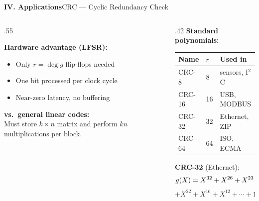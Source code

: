 \begin{frame}{\textbf{IV. Applications}}{CRC --- Cyclic Redundancy Check}

\begin{columns}[T]
  \begin{column}{.55\textwidth}

    \medskip
    \textbf{Hardware advantage (LFSR):}
    \begin{itemize}\small
      \item Only $r = \deg g$ flip-flops needed
      \item One bit processed per clock cycle
      \item Near-zero latency, no buffering
    \end{itemize}

    \medskip
    \textbf{vs.\ general linear codes:}\\
    {\small Must store $k\times n$ matrix and perform $kn$ multiplications per block.}
  \end{column}
  \begin{column}{.42\textwidth}
    \textbf{Standard polynomials:}
    \medskip
    \renewcommand{\arraystretch}{1.3}
    \begin{tabular}{@{}lll@{}}
      \toprule
      Name & $r$ & Used in\\
      \midrule
      CRC-8  & 8  & sensors, I$^2$C\\
      CRC-16 & 16 & USB, MODBUS\\
      CRC-32 & 32 & Ethernet, ZIP\\
      CRC-64 & 64 & ISO, ECMA\\
      \bottomrule
    \end{tabular}

    \medskip\small
    \textbf{CRC-32} (Ethernet):
    \[\small g(X)=X^{32}+X^{26}+X^{23}\]
    \[+X^{22}+X^{16}+X^{12}+\cdots+1\]
  \end{column}
\end{columns}
\end{frame}

